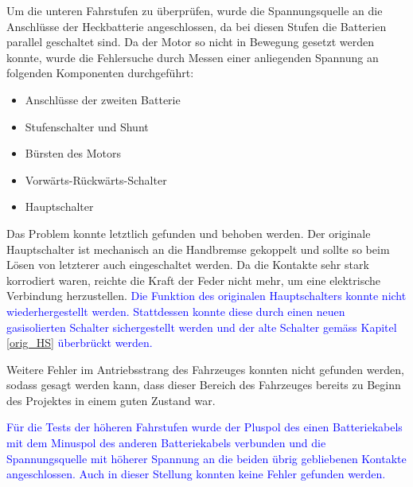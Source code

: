 Um die unteren Fahrstufen zu überprüfen, wurde die Spannungsquelle an die Anschlüsse der Heckbatterie angeschlossen, da bei diesen Stufen die Batterien parallel geschaltet sind. Da der Motor so nicht in Bewegung gesetzt werden konnte, wurde die Fehlersuche durch Messen einer anliegenden Spannung an folgenden Komponenten durchgeführt: \newpage\begin{itemize}
	\item Anschlüsse der zweiten Batterie
	\item Stufenschalter und Shunt
	\item Bürsten des Motors
	\item Vorwärts-Rückwärts-Schalter
	\item Hauptschalter
\end{itemize}

Das Problem konnte letztlich gefunden und behoben werden. Der originale Hauptschalter ist mechanisch an die Handbremse gekoppelt und sollte so beim Lösen von letzterer auch eingeschaltet werden. Da die Kontakte sehr stark korrodiert waren, reichte die Kraft der Feder nicht mehr, um eine elektrische Verbindung herzustellen. \textcolor{blue}{Die Funktion des originalen Hauptschalters konnte nicht wiederhergestellt werden. Stattdessen konnte diese durch einen neuen gasisolierten Schalter sichergestellt werden und der alte Schalter gemäss Kapitel \ref{orig_HS} überbrückt werden.}

Weitere Fehler im Antriebsstrang des Fahrzeuges konnten nicht gefunden werden, sodass gesagt werden kann, dass dieser Bereich des Fahrzeuges bereits zu Beginn des Projektes in einem guten Zustand war.

\textcolor{blue}{Für die Tests der höheren Fahrstufen wurde der Pluspol des einen Batteriekabels mit dem Minuspol des anderen Batteriekabels verbunden und die Spannungsquelle mit höherer Spannung an die beiden übrig gebliebenen Kontakte angeschlossen. Auch in dieser Stellung konnten keine Fehler gefunden werden.}



\newpage